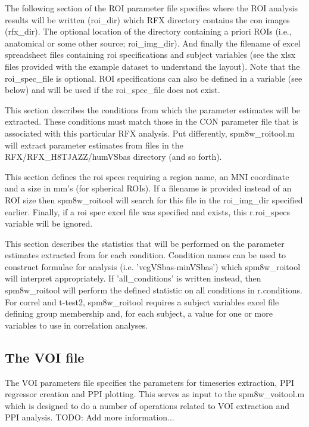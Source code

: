 \documentclass[12pt]{article}
\begin{document}
The following section of the ROI parameter file specifies where the ROI analysis results will be written (roi\_dir) which RFX directory contains the con images (rfx\_dir). The optional location of the directory containing a priori ROIs (i.e., anatomical or some other source; roi\_img\_dir). And finally the filename of excel spreadsheet files containing roi specifications and subject variables (see the xlsx files provided with the example dataset to understand the layout). Note that the roi\_spec\_file is optional. ROI specifications can also be defined in a variable (see below) and will be used if the roi\_spec\_file does not exist.


This section describes the conditions from which the parameter estimates will be extracted. These conditions must match those in the CON parameter file that is associated with this particular RFX analysis. Put differently, spm8w\_roitool.m will extract parameter estimates from files in the RFX/RFX\_H8TJAZZ/humVSbas directory (and so forth). 


This section defines the roi specs requiring a region name, an MNI coordinate and a size in mm's (for spherical ROIs). If a filename is provided instead of an ROI size then spm8w\_roitool will search for this file in the roi\_img\_dir specified earlier. Finally, if a roi spec excel file was specified and exists, this r.roi\_specs variable will be ignored.


This section describes the statistics that will be performed on the parameter estimates extracted from for each condition. Condition names can be used to construct formulae for analysis (i.e. 'vegVSbas-minVSbas') which spm8w\_roitool will interpret appropriately. If 'all\_conditions' is written instead, then spm8w\_roitool will perform the defined statistic on all conditions in r.conditions. 
For correl and t-test2, spm8w\_roitool requires a subject variables excel file defining group membership and, for each subject, a value for one or more variables to use in correlation analyses.


\subsection{The VOI file}
The VOI parameters file specifies the parameters for timeseries extraction, PPI regressor creation and PPI plotting. This serves as input to the spm8w\_voitool.m which is designed to do a number of operations related to VOI extraction and PPI analysis. TODO: Add more information... 
\newpage
\end{document}
